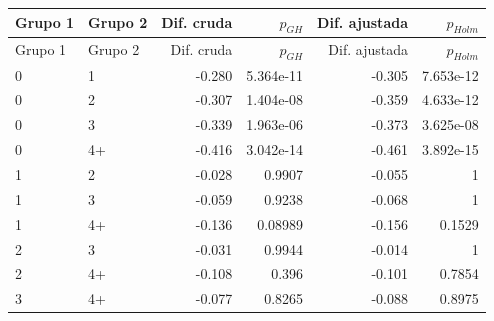 \begin{longtable}{llrrrr}
\toprule
Grupo 1 & Grupo 2 & Dif. cruda & $p_{GH}$ & Dif. ajustada & $p_{Holm}$ \\
\midrule
\endfirsthead
\toprule
Grupo 1 & Grupo 2 & Dif. cruda & $p_{GH}$ & Dif. ajustada & $p_{Holm}$ \\
\midrule
\endhead
0 & 1 & -0.280 & 5.364e-11 & -0.305 & 7.653e-12 \\
0 & 2 & -0.307 & 1.404e-08 & -0.359 & 4.633e-12 \\
0 & 3 & -0.339 & 1.963e-06 & -0.373 & 3.625e-08 \\
0 & 4+ & -0.416 & 3.042e-14 & -0.461 & 3.892e-15 \\
1 & 2 & -0.028 & 0.9907 & -0.055 & 1 \\
1 & 3 & -0.059 & 0.9238 & -0.068 & 1 \\
1 & 4+ & -0.136 & 0.08989 & -0.156 & 0.1529 \\
2 & 3 & -0.031 & 0.9944 & -0.014 & 1 \\
2 & 4+ & -0.108 & 0.396 & -0.101 & 0.7854 \\
3 & 4+ & -0.077 & 0.8265 & -0.088 & 0.8975 \\
\bottomrule
\end{longtable}
